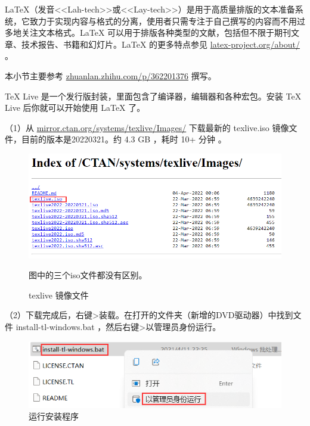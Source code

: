 \label{chap_tools}  %

\LaTeX{}（发音<<Lah-tech>>或<<Lay-tech>>）是用于高质量排版的文本准备系统，它致力于实现内容与格式的分离，使用者只需专注于自己撰写的内容而不用过多地关注文本格式。\LaTeX{} 可以用于排版各种类型的文献，包括但不限于期刊文章、技术报告、书籍和幻灯片。\LaTeX{} 的更多特点参见 \href{https://www.latex-project.org/about/}{latex-project.org/about/} 。


本小节主要参考 \href{https://zhuanlan.zhihu.com/p/362201376}{zhuanlan.zhihu.com/p/362201376} 撰写。

\TeX{} Live 是一个发行版封装，里面包含了编译器，编辑器和各种宏包。安装 \TeX{} Live 后你就可以开始使用 \LaTeX{} 了。

（1）从 \href{https://mirror.ctan.org/systems/texlive/Images/}{mirror.ctan.org/systems/texlive/Images/} 下载最新的 texlive.iso 镜像文件，目前的版本是20220321。约 4.3 GB ，耗时 10+ 分钟 。

\begin{figure}[H]  %
  \centering  %
  \includegraphics[scale=.5]{figure/texliveImages.png}  %

  { 图中的三个iso文件都没有区别。}  %
  \caption{texlive 镜像文件}  %
  \label{fig:tools:texliveImages}  %
\end{figure}

（2）下载完成后，右键>装载。在打开的文件夹（新增的DVD驱动器）中找到文件 install-tl-windows.bat ，然后右键>以管理员身份运行。

\begin{figure}[H]  %
  \centering  %
  \includegraphics[scale=.5]{figure/installbat.png}  %
  \caption{运行安装程序}  %
  \label{fig:tools:bat}  %
\end{figure}

